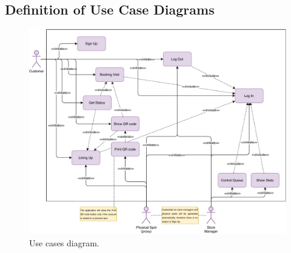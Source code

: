 \subsection{Definition of Use Case Diagrams}


\begin{figure}[H]
    \centering
    \includegraphics[width=1.0\textwidth]{images/use_cases_diagram.pdf}
    \caption{Use cases diagram.}
\end{figure}

